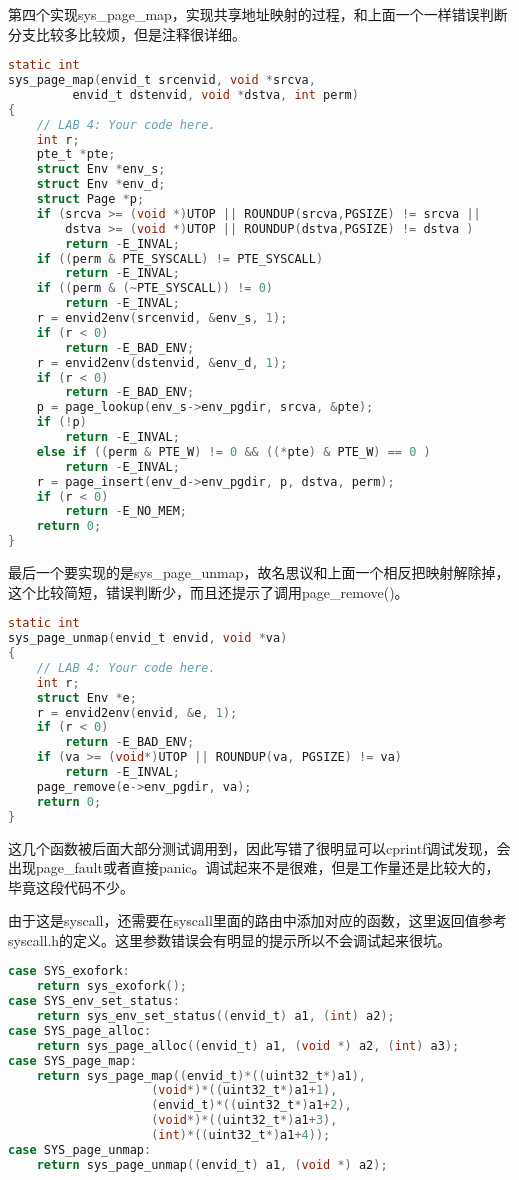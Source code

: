 \documentclass[11pt,a4paper]{article}
\begin{document}
第四个实现sys\_page\_map，实现共享地址映射的过程，和上面一个一样错误判断分支比较多比较烦，但是注释很详细。

\setmainfont{Consolas}
\begin{lstlisting}[language={C},firstnumber=1,title=kern/syscall.c] 
static int
sys_page_map(envid_t srcenvid, void *srcva,
	     envid_t dstenvid, void *dstva, int perm)
{
	// LAB 4: Your code here.
	int r;
	pte_t *pte;
	struct Env *env_s;
	struct Env *env_d;
	struct Page *p;
	if (srcva >= (void *)UTOP || ROUNDUP(srcva,PGSIZE) != srcva ||
		dstva >= (void *)UTOP || ROUNDUP(dstva,PGSIZE) != dstva )
		return -E_INVAL;
	if ((perm & PTE_SYSCALL) != PTE_SYSCALL)
		return -E_INVAL;
	if ((perm & (~PTE_SYSCALL)) != 0)
		return -E_INVAL;
	r = envid2env(srcenvid, &env_s, 1);
	if (r < 0)
		return -E_BAD_ENV;
	r = envid2env(dstenvid, &env_d, 1);
	if (r < 0)
		return -E_BAD_ENV;
	p = page_lookup(env_s->env_pgdir, srcva, &pte);
	if (!p)
		return -E_INVAL;
	else if ((perm & PTE_W) != 0 && ((*pte) & PTE_W) == 0 )
		return -E_INVAL;
	r = page_insert(env_d->env_pgdir, p, dstva, perm);
	if (r < 0)
		return -E_NO_MEM;
	return 0;
}
\end{lstlisting}
\setmainfont[BoldFont=黑体]{宋体}

最后一个要实现的是sys\_page\_unmap，故名思议和上面一个相反把映射解除掉，这个比较简短，错误判断少，而且还提示了调用page\_remove()。

\setmainfont{Consolas}
\begin{lstlisting}[language={C},firstnumber=1,title=kern/syscall.c] 
static int
sys_page_unmap(envid_t envid, void *va)
{
	// LAB 4: Your code here.
	int r;
	struct Env *e;
	r = envid2env(envid, &e, 1);
    if (r < 0)
        return -E_BAD_ENV;  
    if (va >= (void*)UTOP || ROUNDUP(va, PGSIZE) != va)
		return -E_INVAL;
    page_remove(e->env_pgdir, va);
    return 0;
}
\end{lstlisting}
\setmainfont[BoldFont=黑体]{宋体}

这几个函数被后面大部分测试调用到，因此写错了很明显可以cprintf调试发现，会出现page\_fault或者直接panic。调试起来不是很难，但是工作量还是比较大的，毕竟这段代码不少。

由于这是syscall，还需要在syscall里面的路由中添加对应的函数，这里返回值参考syscall.h的定义。这里参数错误会有明显的提示所以不会调试起来很坑。

\setmainfont{Consolas}
\begin{lstlisting}[language={C},firstnumber=1,title=kern/syscall.c] 
case SYS_exofork:
	return sys_exofork();
case SYS_env_set_status:
	return sys_env_set_status((envid_t) a1, (int) a2);
case SYS_page_alloc:
	return sys_page_alloc((envid_t) a1, (void *) a2, (int) a3);
case SYS_page_map:
	return sys_page_map((envid_t)*((uint32_t*)a1),
					(void*)*((uint32_t*)a1+1), 
					(envid_t)*((uint32_t*)a1+2),
					(void*)*((uint32_t*)a1+3),
					(int)*((uint32_t*)a1+4));
case SYS_page_unmap:
	return sys_page_unmap((envid_t) a1, (void *) a2);
\end{lstlisting}
\setmainfont[BoldFont=黑体]{宋体}
\end{document}
